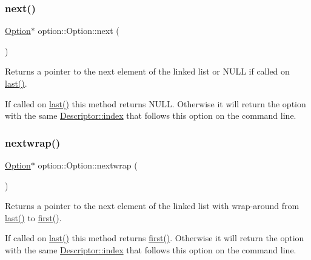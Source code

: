 \subsubsection{\texorpdfstring{next()}{next()}}
{\footnotesize\ttfamily \hyperlink{classoption_1_1Option}{Option}$\ast$ option\+::\+Option\+::next (\begin{DoxyParamCaption}{ }\end{DoxyParamCaption})\hspace{0.3cm}{\ttfamily [inline]}}



Returns a pointer to the next element of the linked list or N\+U\+LL if called on \hyperlink{classoption_1_1Option_afe2aff68191e55b59c53fac3dbbcd7c3}{last()}. 

If called on \hyperlink{classoption_1_1Option_afe2aff68191e55b59c53fac3dbbcd7c3}{last()} this method returns N\+U\+LL. Otherwise it will return the option with the same \hyperlink{structoption_1_1Descriptor_a1fee8ac44f529c99ac2b1149b4c391b1}{Descriptor\+::index} that follows this option on the command line. \mbox{\label{classoption_1_1Option_ae8d8c058af3c781cb1d444998df48fef}} 
\subsubsection{\texorpdfstring{nextwrap()}{nextwrap()}}
{\footnotesize\ttfamily \hyperlink{classoption_1_1Option}{Option}$\ast$ option\+::\+Option\+::nextwrap (\begin{DoxyParamCaption}{ }\end{DoxyParamCaption})\hspace{0.3cm}{\ttfamily [inline]}}



Returns a pointer to the next element of the linked list with wrap-\/around from \hyperlink{classoption_1_1Option_afe2aff68191e55b59c53fac3dbbcd7c3}{last()} to \hyperlink{classoption_1_1Option_abb4e13cd7c90999c8a6b1f871cece283}{first()}. 

If called on \hyperlink{classoption_1_1Option_afe2aff68191e55b59c53fac3dbbcd7c3}{last()} this method returns \hyperlink{classoption_1_1Option_abb4e13cd7c90999c8a6b1f871cece283}{first()}. Otherwise it will return the option with the same \hyperlink{structoption_1_1Descriptor_a1fee8ac44f529c99ac2b1149b4c391b1}{Descriptor\+::index} that follows this option on the command line. \mbox{\label{classoption_1_1Option_a3c0504baaa809c622d59c2c09f83e25b}} 
